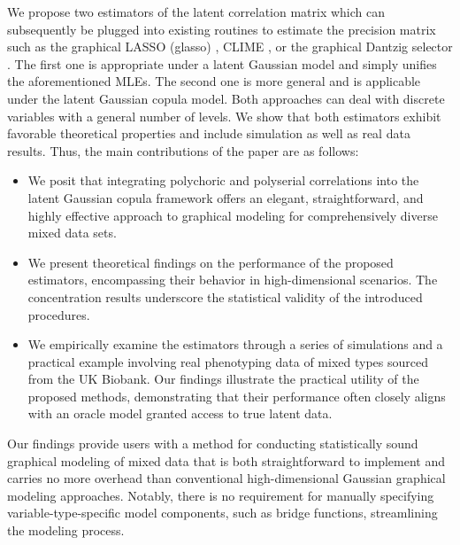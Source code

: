 We propose two estimators of the latent correlation matrix which can subsequently be plugged into existing routines to estimate the precision matrix such as the graphical LASSO (glasso) \citep{Friedman08}, CLIME \citep{Cai11}, or the graphical Dantzig selector \citep{Yuan10}. The first one is appropriate under a latent Gaussian model and simply unifies the aforementioned MLEs. The second one is more general and is applicable under the latent Gaussian copula model. Both approaches can deal with discrete variables with a general number of levels.
We show that both estimators exhibit favorable theoretical properties and include simulation as well as real data results. Thus, the main contributions of the paper are as follows:
\begin{itemize}
\item We posit that integrating polychoric and polyserial correlations into the latent Gaussian copula framework offers an elegant, straightforward, and highly effective approach to graphical modeling for comprehensively diverse mixed data sets.
\item We present theoretical findings on the performance of the proposed estimators, encompassing their behavior in high-dimensional scenarios. The concentration results underscore the statistical validity of the introduced procedures.
\item We empirically examine the estimators through a series of simulations and a practical example involving real phenotyping data of mixed types sourced from the UK Biobank. Our findings illustrate the practical utility of the proposed methods, demonstrating that their performance often closely aligns with an oracle model granted access to true latent data.
\end{itemize}

Our findings provide users with a method for conducting statistically sound graphical modeling of mixed data that is both straightforward to implement and carries no more overhead than conventional high-dimensional Gaussian graphical modeling approaches. Notably, there is no requirement for manually specifying variable-type-specific model components, such as bridge functions, streamlining the modeling process.

